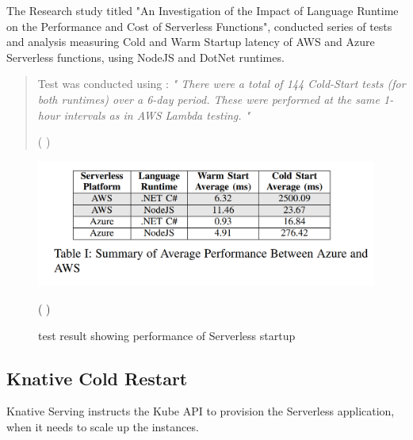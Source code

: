 \documentclass{article}
\begin{document}
\begin{flushleft}
The Research study titled "An Investigation of the Impact of Language Runtime on the Performance and Cost of
Serverless Functions", conducted series of tests and analysis measuring Cold and Warm Startup latency of AWS and Azure Serverless functions, using NodeJS and DotNet runtimes. 

\begin{quote}
    Test was conducted using : \newline
     \textit{ " There were a total of 144 Cold-Start tests (for both runtimes) over a 6-day period. These were performed at the same 1-hour intervals as in AWS Lambda testing. "} 
     \begin{flushright}
         ( \cite{8605773} )
     \end{flushright} 
\end{quote}

\hfill \break
\begin{figure}[h]
    \centering 
    \includegraphics[width=0.5\linewidth]{images/Table_Ref_Code_Start_UCC-Companion.2018.00050.PNG}
    \caption{test result showing performance of Serverless startup} 
    \begin{flushright}
         ( \cite{8605773} )
    \end{flushright}
\end{figure}
\pagebreak
\subsection{Knative Cold Restart}
Knative Serving instructs the Kube API to provision the Serverless application, when it needs to scale up the instances. 


\end{flushleft}
\end{document}
